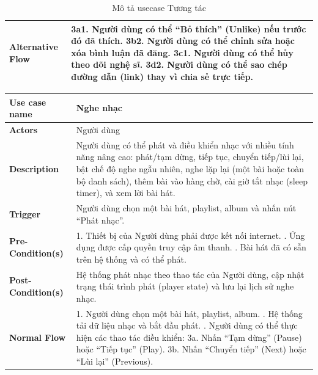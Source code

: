 \documentclass[a4paper]{article}
\newcommand{\cach}{\hspace*{1.5em}\ignorespaces}
\begin{document}
\begin{table}[h!]
\begin{tabularx}{\textwidth}{|l|X|}
\textbf{Alternative Flow} 
& 3a1. Người dùng có thể “Bỏ thích” (Unlike) nếu trước đó đã thích. \newline
  3b2. Người dùng có thể chỉnh sửa hoặc xóa bình luận đã đăng. \newline
  3c1. Người dùng có thể hủy theo dõi nghệ sĩ. \newline
  3d2. Người dùng có thể sao chép đường dẫn (link) thay vì chia sẻ trực tiếp. \\ \hline
\end{tabularx}
\caption{Mô tả usecase Tương tác}
\end{table}

\begin{table}[h!]
\centering
\renewcommand{\arraystretch}{1.3} %
\begin{tabularx}{\textwidth}{|l|X|}
\hline
\textbf{Use case name} & Nghe nhạc \\ \hline
\textbf{Actors}        & Người dùng \\ \hline
\textbf{Description}   & Người dùng có thể phát và điều khiển nhạc với nhiều tính năng nâng cao: phát/tạm dừng, tiếp tục, chuyển tiếp/lùi lại, bật chế độ nghe ngẫu nhiên, nghe lặp lại (một bài hoặc toàn bộ danh sách), thêm bài vào hàng chờ, cài giờ tắt nhạc (sleep timer), và xem lời bài hát. \\ \hline
\textbf{Trigger}       & Người dùng chọn một bài hát, playlist, album và nhấn nút “Phát nhạc”. \\ \hline
\textbf{Pre-Condition(s)} 
& 1. Thiết bị của Người dùng phải được kết nối internet. \newline
  2. Ứng dụng được cấp quyền truy cập âm thanh. \newline
  3. Bài hát đã có sẵn trên hệ thống và có thể phát. \\ \hline
\textbf{Post-Condition(s)} 
& Hệ thống phát nhạc theo thao tác của Người dùng, cập nhật trạng thái trình phát (player state) và lưu lại lịch sử nghe nhạc. \\ \hline
\textbf{Normal Flow}   
& 1. Người dùng chọn một bài hát, playlist, album. \newline
  2. Hệ thống tải dữ liệu nhạc và bắt đầu phát. \newline
  3. Người dùng có thể thực hiện các thao tác điều khiển: \newline
  \cach 3a. Nhấn “Tạm dừng” (Pause) hoặc “Tiếp tục” (Play). \newline
  \cach 3b. Nhấn “Chuyển tiếp” (Next) hoặc “Lùi lại” (Previous). \newline

\end{tabularx}
\end{table}
\end{document}
